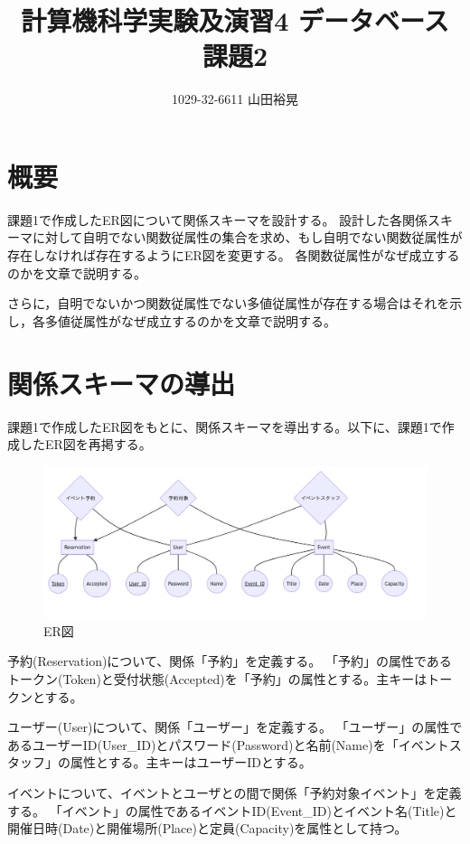 \documentclass[dvipdfmx]{jarticle}
\begin{document}
\title{計算機科学実験及演習4 データベース 課題2}
\author{1029-32-6611 山田裕晃}
\maketitle

\section{概要}
課題1で作成したER図について関係スキーマを設計する。
設計した各関係スキーマに対して自明でない関数従属性の集合を求め、もし自明でない関数従属性が存在しなければ存在するようにER図を変更する。
各関数従属性がなぜ成立するのかを文章で説明する。

さらに，自明でないかつ関数従属性でない多値従属性が存在する場合はそれを示し，各多値従属性がなぜ成立するのかを文章で説明する。

\section{関係スキーマの導出}
課題1で作成したER図をもとに、関係スキーマを導出する。以下に、課題1で作成したER図を再掲する。
\begin{figure}[H]
  \centering
  \includegraphics[scale=0.4]{ermodel.png}
  \caption{ER図}
\end{figure}

予約(Reservation)について、関係「予約」を定義する。
「予約」の属性であるトークン(Token)と受付状態(Accepted)を「予約」の属性とする。主キーはトークンとする。

ユーザー(User)について、関係「ユーザー」を定義する。
「ユーザー」の属性であるユーザーID(User\_ID)とパスワード(Password)と名前(Name)を「イベントスタッフ」の属性とする。主キーはユーザーIDとする。

イベントについて、イベントとユーザとの間で関係「予約対象イベント」を定義する。
「イベント」の属性であるイベントID(Event\_ID)とイベント名(Title)と開催日時(Date)と開催場所(Place)と定員(Capacity)を属性として持つ。
\end{document}
